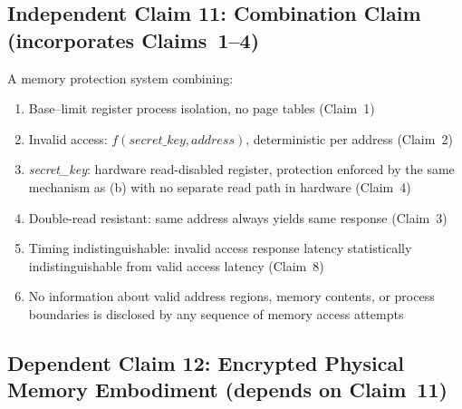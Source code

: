 \documentclass[12pt,letterpaper]{article}
\begin{document}
\medskip

\subsection*{Independent Claim 11: Combination Claim
  (incorporates Claims~1--4)}

A memory protection system combining:
\begin{enumerate}[label=(\alph*),noitemsep]
  \item Base--limit register process isolation, no page tables (Claim~1)
  \item Invalid access: $f(\textit{secret\_key}, \textit{address})$,
        deterministic per address (Claim~2)
  \item \textit{secret\_key}: hardware read-disabled register, protection
        enforced by the same mechanism as (b) with no separate read path
        in hardware (Claim~4)
  \item Double-read resistant: same address always yields same response
        (Claim~3)
  \item Timing indistinguishable: invalid access response latency
        statistically indistinguishable from valid access latency
        (Claim~8)
  \item No information about valid address regions, memory contents, or
        process boundaries is disclosed by any sequence of memory access
        attempts
\end{enumerate}

\medskip

\subsection*{Dependent Claim 12: Encrypted Physical Memory Embodiment
  (depends on Claim~11)}
\end{document}
